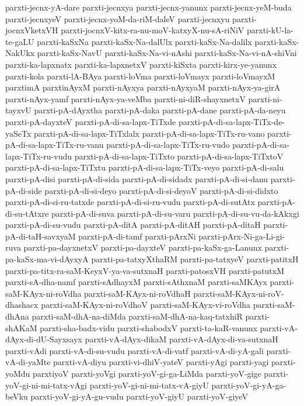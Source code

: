 {parxti-jecnx-yA-dare
parxti-jecnxya
parxti-jecnx-yanunx
parxti-jecnx-yeM-buda
parxti-jecnxyeV
parxti-jecnx-yoM-da-riM-daleV
parxti-jecnxyu
parxti-jocnxVketxVH
parxti-jocnxV-kitx-ra-nu-moV-katxyX-nu-sA-riNiV
parxti-kU-la-te-gaLU
parxti-kaSxNa
parxti-kaSx-Na-dalUlx
parxti-kaSx-Na-dalilx
parxti-kaSx-NakUkx
parxti-kaSx-NavU
parxti-kaSx-Na-vi-nAshi
parxti-kaSx-Na-vi-nA-shiVni
parxti-ka-lapxnatx
parxti-ka-lapxnetxV
parxti-kiSxta
parxti-kirx-ye-yanunx
parxti-kola
parxti-lA-BAya
parxti-loVma
parxti-loVmayx
parxti-loVmayxM
parxtimA
parxtinAyxM
parxti-nAyxya
parxti-nAyxyaM
parxti-nAyx-ya-girA
parxti-nAyx-yamf
parxti-nAyx-ya-veMba
parxti-ni-diR-shayxnetxV
parxti-ni-tayxvU
parxti-pA-dAyxtha
parxti-pA-daka
parxti-pA-dane
parxti-pA-da-neyu
parxti-pA-dayxteV
parxti-pA-di-sa-lapx-TiTxde
parxti-pA-di-sa-lapx-TiTx-de-yaSeTx
parxti-pA-di-sa-lapx-TiTxlalx
parxti-pA-di-sa-lapx-TiTx-ru-vano
parxti-pA-di-sa-lapx-TiTx-ru-vanu
parxti-pA-di-sa-lapx-TiTx-ru-vudo
parxti-pA-di-sa-lapx-TiTx-ru-vudu
parxti-pA-di-sa-lapx-TiTxto
parxti-pA-di-sa-lapx-TiTxtoV
parxti-pA-di-sa-lapx-TiTxtu
parxti-pA-di-sa-lapx-TiTx-veyo
parxti-pA-di-salu
parxti-pA-disi
parxti-pA-di-sida
parxti-pA-di-sidadx
parxti-pA-di-si-danu
parxti-pA-di-side
parxti-pA-di-si-deyo
parxti-pA-di-si-deyoV
parxti-pA-di-si-didxto
parxti-pA-di-si-ru-tatxde
parxti-pA-di-si-ru-vudu
parxti-pA-di-sutAtx
parxti-pA-di-su-tAtxre
parxti-pA-di-suva
parxti-pA-di-su-varu
parxti-pA-di-su-vu-da-kAkxgi
parxti-pA-di-su-vudu
parxti-pA-ditA
parxti-pA-ditAH
parxti-pA-ditaH
parxti-pA-di-taH-savxyaM
parxti-pA-di-tamf
parxti-pArxNi
parxti-pArx-Ni-ga-Li-gi-ruva
parxti-pa-dayxnetxV
parxti-pa-dayxteV
parxti-pa-kaSx-ga-Lanunx
parxti-pa-kaSx-ma-vi-dAyxyA
parxti-pa-tatxyXthaRM
parxti-pa-tatxyeV
parxti-patitxH
parxti-pa-titx-ra-saM-KeyxV-ya-va-sutxnaH
parxti-patosxVH
parxti-patutxM
parxti-sA-dha-namf
parxti-sAdhayxM
parxti-sAthxnaM
parxti-saMKAyx
parxti-saM-KAyx-ni-roVdha
parxti-saM-KAyx-ni-roVdhaH
parxti-saM-KAyx-ni-roV-dhashacx
parxti-saM-KAyx-ni-roVdhoV
parxti-saM-KAyx-vi-roVdha
parxti-saM-dhAna
parxti-saM-dhA-na-diMda
parxti-saM-dhA-na-kaq-tatxhiR
parxti-shAKaM
parxti-sha-badx-vidu
parxti-shabodxV
parxti-ta-kaR-vanunx
parxti-vA-dAyx-di-dU-Sayxsayx
parxti-vA-dAyx-dikaM
parxti-vA-dAyx-di-va-sutxnaH
parxti-vAdi
parxti-vA-di-su-vudu
parxti-vA-di-vatf
parxti-vA-di-yA-gali
parxti-vA-di-yaMte
parxti-vA-diyu
parxti-vi-dhiV-yateV
parxti-yAgi
parxti-yagi
parxti-yoMdu
parxtiyoV
parxti-yoVgi
parxti-yoV-gi-ga-LiMda
parxti-yoV-gige
parxti-yoV-gi-ni-mi-tatx-vAgi
parxti-yoV-gi-ni-mi-tatx-vA-giyU
parxti-yoV-gi-yA-ga-beVku
parxti-yoV-gi-yA-gu-vudu
parxti-yoV-giyU
parxti-yoV-giyeV
}
